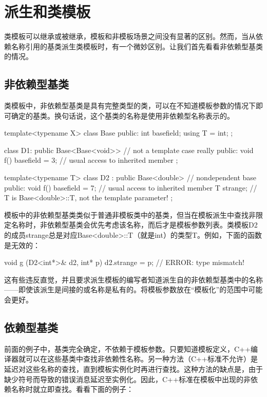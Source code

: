 \section{派生和类模板}

类模板可以继承或被继承，模板和非模板场景之间没有显著的区别。然而，当从依赖名称引用的基类派生类模板时，有一个微妙区别。让我们首先看看非依赖型基类的情况。

\subsection{非依赖型基类}

类模板中，非依赖型基类是具有完整类型的类，可以在不知道模板参数的情况下即可确定的基类。换句话说，这个基类的名称是使用非依赖型名称表示的。

\begin{cpp}
template<typename X>
class Base {
	public:
	int basefield;
	using T = int;
};

class D1: public Base<Base<void>> { // not a template case really
	public:
	void f() { basefield = 3; } // usual access to inherited member
};

template<typename T>
class D2 : public Base<double> { // nondependent base
	public:
	void f() { basefield = 7; } // usual access to inherited member
	T strange; // T is Base<double>::T, not the template parameter!
};
\end{cpp}

模板中的非依赖型基类类似于普通非模板类中的基类，但当在模板派生中查找非限定名称时，非依赖型基类会优先考虑该名称，而后才是模板参数列表。类模板D2的成员strange总是对应Base<double>::T（就是int）的类型T。例如，下面的函数是无效的：

\begin{cpp}
void g (D2<int*>& d2, int* p) {
	d2.strange = p; // ERROR: type mismatch!
}
\end{cpp}

这有些违反直觉，并且要求派生模板的编写者知道派生自的非依赖型基类中的名称——即使该派生是间接的或名称是私有的。将模板参数放在“模板化”的范围中可能会更好。

\subsection{依赖型基类}

前面的例子中，基类完全确定，不依赖于模板参数。只要知道模板定义，C++编译器就可以在这些基类中查找非依赖性名称。另一种方法（C++标准不允许）是延迟对这些名称的查找，直到模板实例化时再进行查找。这种方法的缺点是，由于缺少符号而导致的错误消息延迟至实例化。因此，C++标准在模板中出现的非依赖名称时就立即查找。看看下面的例子：

